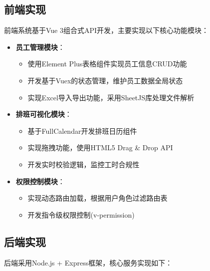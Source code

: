 \documentclass{ctexart}
\begin{document}
\subsection{前端实现}
前端系统基于Vue 3组合式API开发，主要实现以下核心功能模块：

\begin{itemize}
    \item \textbf{员工管理模块}：
    \begin{itemize}
        \item 使用Element Plus表格组件实现员工信息CRUD功能
        \item 开发基于Vuex的状态管理，维护员工数据全局状态
        \item 实现Excel导入导出功能，采用SheetJS库处理文件解析
    \end{itemize}

    \item \textbf{排班可视化模块}：
    \begin{itemize}
        \item 基于FullCalendar开发排班日历组件
        \item 实现拖拽功能，使用HTML5 Drag \& Drop API
        \item 开发实时校验逻辑，监控工时合规性
    \end{itemize}

    \item \textbf{权限控制模块}：
    \begin{itemize}
        \item 实现动态路由加载，根据用户角色过滤路由表
        \item 开发指令级权限控制(v-permission)
    \end{itemize}
\end{itemize}

\subsection{后端实现}
后端采用Node.js + Express框架，核心服务实现如下：
\end{document}
